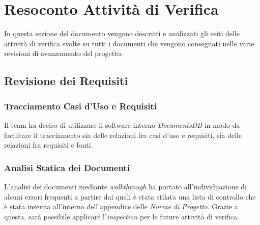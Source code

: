 \newpage
\section{Resoconto Attività di Verifica}
In questa sezione del documento vengono descritti e analizzati gli esiti delle attività di verifica svolte su tutti i documenti che vengono consegnati nelle varie revisioni di avanzamento del progetto.

\subsection{Revisione dei Requisiti}

\subsubsection{Tracciamento Casi d'Uso e Requisiti}
Il team ha deciso di utilizzare il software interno \textit{DocumentsDB} in modo da facilitare il tracciamento sia delle relazioni fra casi d'uso e requisiti, sia delle relazioni fra requisiti e fonti.

\subsubsection{Analisi Statica dei Documenti}
L'analisi dei documenti mediante \textit{walkthrough} ha portato all'individuazione di alcuni errori frequenti a partire dai quali è stata stilata una lista di controllo che è stata inserita all'interno dell'appendice delle \textit{Norme di Progetto}. Grazie a questa, sarà possibile applicare l'\textit{inspection} per le future attività di verifica.


